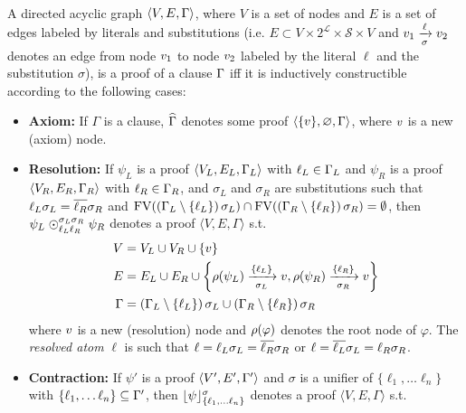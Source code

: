 \begin{definition} 
\label{def:proof} \hfill \\
A directed acyclic graph $\langle V, E, \clause \rangle$, where $V$ is a set of nodes and $E$ is a
set of edges labeled by literals and substitutions (i.e. $E \subset V \times 2^{\mathcal{L}} \times \mathcal{S} \times V$ and $\n_1
\xrightarrow[\sigma]{\ell} \n_2$ denotes an edge from node $\n_1$ to node $\n_2$ labeled by the literal $\ell$ and the substitution $\sigma$), is a
proof of a clause $\clause$ iff it is inductively constructible according to the following cases:
%
\begin{itemize}
  \item \textbf{Axiom:} If $\Gamma$ is a clause, $\axiom{\Gamma}$ denotes some proof $\langle \{ \n \}, \varnothing,
    \Gamma \rangle$, where $\n$ is a new (axiom) node.
  \item \textbf{Resolution:} If $\psi_L$ is a proof $\langle V_L, E_L, \clause_L \rangle$ with $\ell_L \in \clause_L$ and
    $\psi_R$ is a proof $\langle V_R, E_R, \clause_R \rangle$ with $\ell_R \in \clause_R$, and 
    $\sigma_L$ and $\sigma_R$ are substitutions such that
    $\ell_L \sigma_L = \dual{\ell_R} \sigma_R$ and
    $\freevar{\left( \clause_L \setminus \left\{ \ell_L \right\} \right) \sigma_L} \cap 
     \freevar{\left( \clause_R
                    \setminus \left\{ \ell_R \right\} \right) \sigma_R} = \emptyset$, 
    then
    $\psi_L \res{\ell_L}{\sigma_L}{\ell_R}{\sigma_R} \psi_R$ denotes a proof $\langle V, E, \Gamma \rangle$ s.t.
    \begin{align*}
      V &= V_L \cup V_R \cup \{\n \} \\
      E &= E_L \cup E_R \cup
                    \left\{ \raiz{\psi_L} \xrightarrow[\sigma_L]{\{\ell_L\} } \n, 
                            \raiz{\psi_R} \xrightarrow[\sigma_R]{\{\ell_R\} } \n \right\} \\
     \Gamma &= \left( \clause_L \setminus \left\{ \ell_L \right\} \right) \sigma_L \cup \left( \clause_R
                    \setminus \left\{ \ell_R \right\} \right) \sigma_R 
    \end{align*}
    where $\n$ is a new (resolution) node and $\raiz{\varphi}$ denotes the root node of $\varphi$. The \emph{resolved atom} $\ell$ is such that $\ell = \ell_L \sigma_L = \dual{\ell_R} \sigma_R$ or $\ell = \dual{\ell_L} \sigma_L = \ell_R \sigma_R$.
  \item \textbf{Contraction:} If $\psi'$ is a proof $\langle V', E', \clause' \rangle$ and $\sigma$ is a unifier of $\{\ell_1, \ldots \ell_n\}$ with $\{\ell_1, \ldots \ell_n\} \subseteq \clause'$, then $\con{\psi}{\{\ell_1, \ldots \ell_n\}}{\sigma}$ denotes a proof $\langle V, E, \Gamma \rangle$ s.t.

\end{itemize}
\end{definition}
